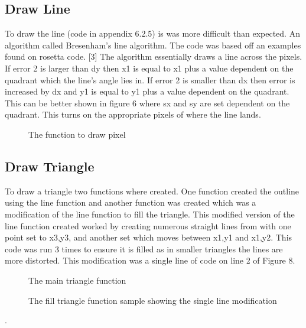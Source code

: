\documentclass[a4paper,12pt]{article}
\newcommand{\GraphicsC}{../Graphics/Graphics.c}
\begin{document}
\subsection{Draw Line}
\begin{flushleft}
To draw the line (code in appendix 6.2.5) is was more difficult than expected. An algorithm called Bresenham's line algorithm. The code was based off an examples found on rosetta code. [3]  The algorithm essentially draws a line across the pixels. If error 2 is larger than dy then x1 is equal to x1 plus a value dependent on the quadrant which the line's angle lies in. If error 2 is smaller than dx then error is increased by dx and y1 is equal to y1 plus a value dependent on the quadrant. This can be better shown in figure 6 where sx and sy are set dependent on the quadrant. This turns on the appropriate pixels of where the line lands.
\end{flushleft}
\begin{figure}[h]
	\centering
	\setlength{\belowcaptionskip}{-15pt}
	
	\caption{The function to draw pixel}
\end{figure}
\subsection{Draw Triangle}
\begin{flushleft}
To draw a triangle two functions where created. One function created the outline using the line function and another function was created which was a modification of the line function to fill the triangle. \newline \newline
This modified version of the line function created worked by creating numerous straight lines from with one point set to x3,y3, and another set which moves between x1,y1 and x1,y2. This code was run 3 times to ensure it is filled as in smaller triangles the lines are more distorted. This modification was a single line of code on line 2 of Figure 8.
\end{flushleft}
\begin{figure}[h]
	\centering
	\setlength{\belowcaptionskip}{-15pt}
	
	\caption{The main triangle function}
\end{figure}
\begin{figure}[h]
	\centering
	\setlength{\belowcaptionskip}{-15pt}
	
	\caption{The fill triangle function sample showing the single line modification}
\end{figure}
\begin{flushleft}
.
\newline
\newline
\end{flushleft}
\end{document}
